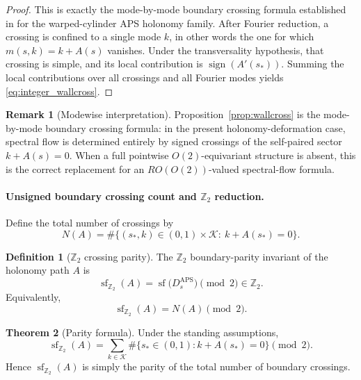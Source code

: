 \documentclass[11pt]{article}
\theoremstyle{definition}
\newtheorem{theorem}{Theorem}[section]
\newtheorem{definition}[theorem]{Definition}
\newtheorem{remark}[remark]{Remark}
\DeclareMathOperator{\APS}{APS}
\numberwithin{equation}{section}
\begin{document}
\begin{proof}
This is exactly the mode-by-mode boundary crossing formula established in
\cite{KS} for the warped-cylinder APS holonomy family. After Fourier
reduction, a crossing is confined to a single mode \(k\), in other words the one for
which \(m(s,k)=k+A(s)\) vanishes. Under the transversality hypothesis, that
crossing is simple, and its local contribution is
\(\operatorname{sign}(A'(s_*))\). Summing the local contributions over all
crossings and all Fourier modes yields \eqref{eq:integer_wallcross}.
\end{proof}

\begin{remark}[Modewise interpretation]
\label{rem:wallcross_summary}
Proposition~\ref{prop:wallcross} is the mode-by-mode boundary crossing formula: in the present
holonomy-deformation case, spectral flow is determined entirely by signed crossings of the self-paired sector \(k+A(s)=0\). When a full pointwise \(O(2)\)-equivariant structure is absent, this is
the correct replacement for an \(RO(O(2))\)-valued spectral-flow formula.
\end{remark}

\paragraph{Unsigned boundary crossing count and \texorpdfstring{$\mathbb Z_2$}{Z2} reduction.}
Define the total number of crossings by
\begin{equation}\label{eq:NA_def_section8}
N(A)
=
\#\bigl\{(s_*,k)\in(0,1)\times\mathcal K:\ k+A(s_*)=0\bigr\}.
\end{equation}

\begin{definition}[\texorpdfstring{$\mathbb Z_2$}{Z2} crossing parity]
\label{def:Z2_wall_parity}
The \(\mathbb Z_2\) boundary-parity invariant of the holonomy path \(A\) is
\begin{equation}\label{eq:SF_Z2_def_from_sf}
\operatorname{sf}_{\mathbb Z_2}(A)
=
\operatorname{sf}\bigl(D_s^{\APS}\bigr)\pmod 2
\in\mathbb Z_2.
\end{equation}
Equivalently,
\begin{equation}\label{eq:SF_Z2_def_from_N}
\operatorname{sf}_{\mathbb Z_2}(A)
=
N(A)\pmod 2.
\end{equation}
\end{definition}

\begin{theorem}[Parity formula]
\label{thm:Z2_parity_formula}
Under the standing assumptions,
\begin{equation}\label{eq:SF_Z2_wallcount}
\operatorname{sf}_{\mathbb Z_2}(A)
=
\sum_{k\in\mathcal K}
\#\bigl\{s_*\in(0,1):k+A(s_*)=0\bigr\}\pmod 2.
\end{equation}
Hence \(\operatorname{sf}_{\mathbb Z_2}(A)\) is simply the parity of the total number of boundary crossings.
\end{theorem}
\end{document}
